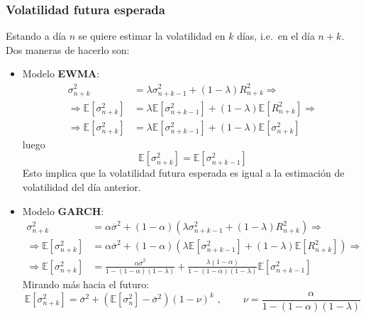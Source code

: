 \subsubsection{Volatilidad futura esperada}
Estando a día $n$ se quiere estimar la volatilidad en $k$ días, i.e.\ en el día $n+k$. Dos maneras de hacerlo son:
\begin{itemize}
    \item Modelo \textbf{EWMA}:
    \begin{align*}
        \sigma_{n+k}^2 &= \lambda \sigma_{n+k-1}^2 + (1 - \lambda) R_{n+k}^2 \Rightarrow \\
        \Rightarrow \mathbb{E}[\sigma_{n+k}^2] &= \lambda \mathbb{E}[\sigma_{n+k-1}^2] + (1 - \lambda) \mathbb{E}[R_{n+k}^2] \Rightarrow \\
        \Rightarrow \mathbb{E}[\sigma_{n+k}^2] &= \lambda \mathbb{E}[\sigma_{n+k-1}^2] + (1 - \lambda) \mathbb{E}[\sigma_{n+k}^2]
    \end{align*}
    luego
    \[
    \boxed{\mathbb{E}[\sigma_{n+k}^2] = \mathbb{E}[\sigma_{n+k-1}^2]}
    \]
    Esto implica que la volatilidad futura esperada es igual a la estimación de volatilidad del día anterior.
    \item Modelo \textbf{GARCH}:
    \begin{align*}
        \sigma_{n+k}^2 &= \alpha \overline{\sigma}^2 + (1 - \alpha) \left( \lambda \sigma_{n+k-1}^2 + (1 - \lambda) R_{n+k}^2 \right) \Rightarrow \\
        \Rightarrow \mathbb{E}[\sigma_{n+k}^2] &= \alpha \overline{\sigma}^2 + (1 - \alpha) \left( \lambda \mathbb{E}[\sigma_{n+k-1}^2] + (1 - \lambda) \mathbb{E}[R_{n+k}^2] \right) \Rightarrow\\
        \Rightarrow \mathbb{E}[\sigma_{n+k}^2] &= \frac{\alpha \overline{\sigma}^2}{1 - (1 - \alpha)(1 - \lambda)} + \frac{\lambda (1 - \alpha)}{1 - (1 - \alpha)(1 - \lambda)} \mathbb{E}[\sigma_{n+k-1}^2]
    \end{align*}
    Mirando más hacia el futuro:
    \[
    \boxed{\mathbb{E}[\sigma_{n+k}^2] = \overline{\sigma}^2 + \left( \mathbb{E}[\sigma_{n}^2] - \overline{\sigma}^2 \right) (1 - \nu)^k} \text{ , } \qquad \nu = \frac{\alpha}{1 - (1 - \alpha)(1 - \lambda)}
    \]
\end{itemize}



